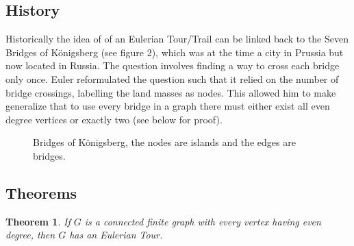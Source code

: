 \documentclass{article}
\newtheorem{theorem}{Theorem}[section]
\begin{document}
\subsection{History}
Historically the idea of of an Eulerian Tour/Trail can be linked back to the Seven Bridges of K{\"o}nigsberg (see figure $2$), which was at the time a city in Prussia but now located in Russia. The question involves finding a way to cross each bridge only once. Euler reformulated the question such that it relied on the number of bridge crossings, labelling the land masses as nodes. This allowed him to make generalize that to use every bridge in a graph there must either exist all even degree vertices or exactly two (see below for proof).
\begin{figure}
  \begin{center}
  \end{center}
\caption{Bridges of K{\"o}nigsberg, the nodes are islands and the edges are bridges.}
\end{figure}

\vspace{10cm}
\subsection{Theorems}

\begin{theorem}
If $G$ is a connected finite graph with every vertex having even degree, then $G$ has an Eulerian Tour.
\end{theorem}
\end{document}
